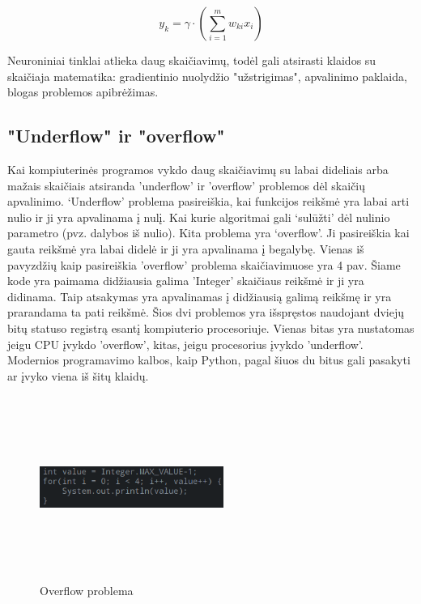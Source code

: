 \documentclass{VUMIFInfKursinis}
\begin{document}
\[
  y_{k} = \gamma \cdot (\sum_{i=1}^{m}w_{ki}x_{i})
\]

Neuroniniai tinklai atlieka daug skaičiavimų, todėl gali atsirasti klaidos su
skaičiaja matematika: gradientinio nuolydžio "užstrigimas", apvalinimo paklaida,
blogas problemos apibrėžimas.

\subsection{"Underflow" ir "overflow"}
\par
Kai kompiuterinės programos vykdo daug skaičiavimų su
labai dideliais arba mažais skaičiais atsiranda 'underflow' ir 'overflow' problemos
dėl skaičių apvalinimo. ‘Underflow’ problema pasireiškia,
kai funkcijos reikšmė yra labai arti nulio ir ji yra apvalinama į nulį. Kai
kurie algoritmai gali ‘sulūžti’ dėl nulinio parametro (pvz. dalybos iš nulio). Kita
problema yra ‘overflow’. Ji pasireiškia kai gauta reikšmė yra labai didelė ir ji yra
apvalinama į begalybę. \cite{salt7} Vienas iš pavyzdžių kaip pasireiškia 'overflow' problema skaičiavimuose
yra 4 pav. Šiame kode yra paimama didžiausia galima 'Integer' skaičiaus reikšmė ir ji
yra didinama. Taip atsakymas yra apvalinamas į didžiausią galimą reikšmę ir
yra prarandama ta pati reikšmė. Šios dvi problemos yra išspręstos naudojant dviejų bitų statuso registrą
esantį kompiuterio procesoriuje. Vienas bitas yra nustatomas jeigu CPU įvykdo 'overflow', kitas, jeigu
procesorius įvykdo 'underflow'. Modernios programavimo kalbos, kaip Python, pagal šiuos du
bitus gali pasakyti ar įvyko viena iš šitų klaidų.

\begin{figure}[ht]
  \centering
  \includegraphics[width=6cm,height=6cm,keepaspectratio]{code1.png}
  \caption{Overflow problema}
  \label{fig:overflowProblem}
\end{figure}
\end{document}
